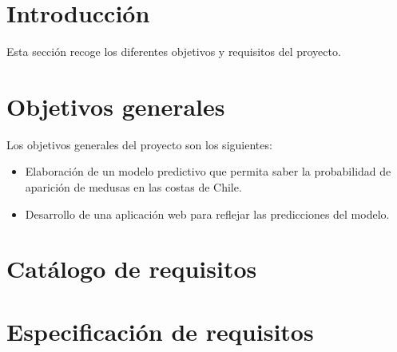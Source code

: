 
\section{Introducción}
Esta sección recoge los diferentes objetivos y requisitos del proyecto.

\section{Objetivos generales}
Los objetivos generales del proyecto son los siguientes:
\begin{itemize}
	\item Elaboración de un modelo predictivo que permita saber la probabilidad de aparición de medusas en las costas de Chile.
	\item Desarrollo de una aplicación web para reflejar las predicciones del modelo.


\end{itemize}
\section{Catálogo de requisitos}

\section{Especificación de requisitos}


